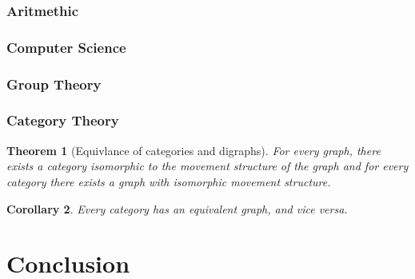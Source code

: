 \documentclass{article}
\theoremstyle{plain}
\newtheorem{theorem}{Theorem}
\newtheorem{corollary}[theorem]{Corollary}
\theoremstyle{definition}
\begin{document}
\subsubsection{Aritmethic}
\subsubsection{Computer Science}
\subsubsection{Group Theory}
\subsubsection{Category Theory}
\begin{theorem}[Equivlance of categories and digraphs]
	For every graph, there exists a category isomorphic to the movement
	structure of the graph and for every category there exists a graph with
	isomorphic movement structure.
\end{theorem}
\begin{corollary}
	Every category has an equivalent graph, and vice versa.
\end{corollary}
\section{Conclusion}
\end{document}
